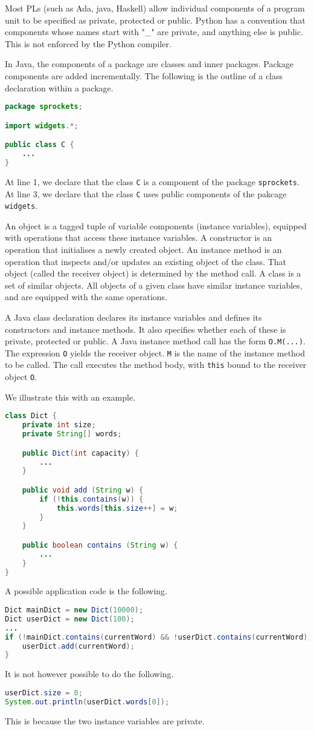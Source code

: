 \documentclass[a4paper, openany]{memoir}
\begin{document}
Most PLs (such as Ada, java, Haskell) allow individual components of a program unit to be specified as private, protected or public. Python has a convention that components whose names start with "\_" are private, and anything else is public. This is not enforced by the Python compiler.

In Java, the components of a package are classes and inner packages. Package components are added incrementally. The following is the outline of a class declaration within a package.
\begin{lstlisting}[language=java]
package sprockets;

import widgets.*;

public class C {
    ...
}
\end{lstlisting}
At line 1, we declare that the class \texttt{C} is a component of the package \texttt{sprockets}. At line 3, we declare that the class \texttt{C} uses public components of the pakcage \texttt{widgets}.

An object is a tagged tuple of variable components (instance variables), equipped with operations that access these instance variables. A constructor is an operation that initialises a newly created object. An instance method is an operation that inspects and/or updates an existing object of the class. That object (called the receiver object) is determined by the method call. A class is a set of similar objects. All objects of a given class have similar instance variables, and are equipped with the same operations.

A Java class declaration declares its instance variables and defines its constructors and instance methods. It also specifies whether each of these is private, protected or public. A Java instance method call has the form \texttt{O.M(...)}. The expression \texttt{O} yields the receiver object. \texttt{M} is the name of the instance method to be called. The call executes the method body, with \texttt{this} bound to the receiver object \texttt{O}.

We illustrate this with an example.
\begin{lstlisting}[language=java]
class Dict {
    private int size;
    private String[] words;

    public Dict(int capacity) {
        ...
    }

    public void add (String w) {
        if (!this.contains(w)) {
            this.words[this.size++] = w;
        }
    }

    public boolean contains (String w) {
        ...
    }
}
\end{lstlisting}
A possible application code is the following.
\begin{lstlisting}[language=java]
Dict mainDict = new Dict(10000);
Dict userDict = new Dict(100);
...
if (!mainDict.contains(currentWord) && !userDict.contains(currentWord)) {
    userDict.add(currentWord);
}
\end{lstlisting}
It is not however possible to do the following.
\begin{lstlisting}[language=java]
userDict.size = 0;
System.out.println(userDict.words[0]);
\end{lstlisting}
This is because the two instance variables are private.
\end{document}
